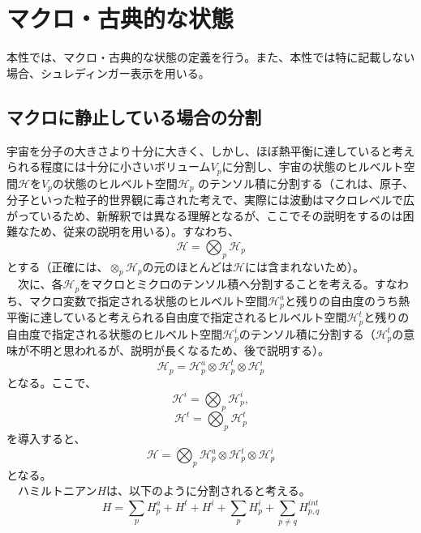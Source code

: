 \section{マクロ・古典的な状態}
本性では、マクロ・古典的な状態の定義を行う。また、本性では特に記載しない場合、シュレディンガー表示を用いる。
\subsection{マクロに静止している場合の分割}
宇宙を分子の大きさより十分に大きく、しかし、ほぼ熱平衡に達していると考えられる程度には十分に小さいボリューム$V_p$に分割し、宇宙の状態のヒルベルト空間$\mathcal{H}$を$V_p$の状態のヒルベルト空間$\mathcal{H}_p$ のテンソル積に分割する（これは、原子、分子といった粒子的世界観に毒された考えで、実際には波動はマクロレベルで広がっているため、新解釈では異なる理解となるが、ここでその説明をするのは困難なため、従来の説明を用いる）。すなわち、
\begin{equation}
    \mathcal{H} = \bigotimes_p \mathcal{H}_p
\end{equation}
とする（正確には、$\otimes_p \mathcal{H}_p$の元のほとんどは$\mathcal{H}$には含まれないため）。\\
　次に、各$\mathcal{H}_p$をマクロとミクロのテンソル積へ分割することを考える。すなわち、マクロ変数で指定される状態のヒルベルト空間$\mathcal{H}_p^a$と残りの自由度のうち熱平衡に達していると考えられる自由度で指定されるヒルベルト空間$\mathcal{H}_p^t$と残りの自由度で指定される状態のヒルベルト空間$\mathcal{H}_p^i$のテンソル積に分割する（$\mathcal{H}_p^t$の意味が不明と思われるが、説明が長くなるため、後で説明する）。
\begin{equation}
    \mathcal{H}_p = \mathcal{H}_p^a \otimes \mathcal{H}_p^t \otimes \mathcal{H}_p^i
\end{equation}
となる。ここで、
\begin{equation}
    \mathcal{H}^i = \bigotimes_p \mathcal{H}_p^i,
\end{equation}
\begin{equation}
    \mathcal{H}^t = \bigotimes_p \mathcal{H}_p^t
\end{equation}
を導入すると、
\begin{equation}
    \mathcal{H} = \bigotimes_p \mathcal{H}_p^a \otimes  \mathcal{H}_p^t \otimes  \mathcal{H}_p^i
\end{equation}
となる。\\
　ハミルトニアン$H$は、以下のように分割されると考える。
\begin{equation}
H=\sum_pH_p^a + H^t + H^i + \sum_p H_p^i + \sum_{p \neq q} H^{int}_{p,q}
\end{equation}
